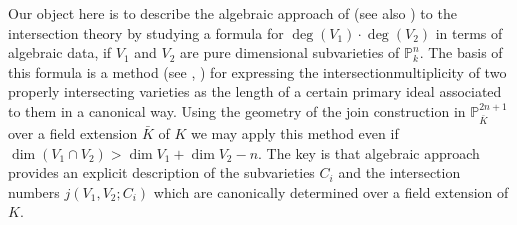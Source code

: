 Our object here is to describe the algebraic approach of \cite{85} (see
also \cite{56}) to the intersection theory by studying a formula for
$\deg (V_1)\cdot \deg (V_2)$ in terms of algebraic data, if $V_1$ and
$V_2$ are pure dimensional subvarieties of $\mathbb{P}^n_k$. The basis
of this formula is a method (see \cite{8}, \cite{98}) for expressing the
intersection\pageoriginale multiplicity of two properly intersecting varieties as the length
of a certain primary ideal associated to them in a canonical
way. Using the geometry of the join construction in
$\mathbb{P}^{2n+1}_{\bar{K}}$ over a field extension $\bar {K}$ of $K$
we may apply this method even if $\dim (V_1\cap V_2)> \dim V_1 + \dim
V_2 -n $. The 
key is that algebraic approach provides an explicit description of the
subvarieties $C_i$ and the intersection numbers $j(V_1,V_2; C_i)$
which are canonically determined over a field extension of $K$.
